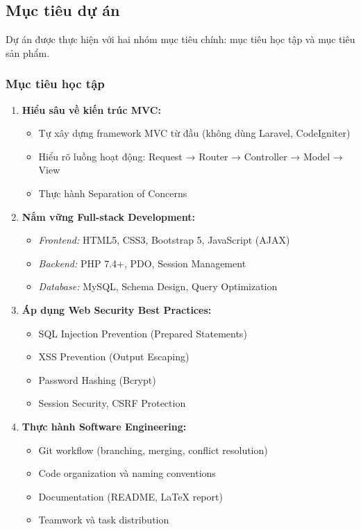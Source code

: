 \subsection{Mục tiêu dự án}

Dự án được thực hiện với hai nhóm mục tiêu chính: mục tiêu học tập và mục tiêu sản phẩm.

\subsubsection{Mục tiêu học tập}

\begin{enumerate}
    \item \textbf{Hiểu sâu về kiến trúc MVC:}
    \begin{itemize}
        \item Tự xây dựng framework MVC từ đầu (không dùng Laravel, CodeIgniter)
        \item Hiểu rõ luồng hoạt động: Request → Router → Controller → Model → View
        \item Thực hành Separation of Concerns
    \end{itemize}

    \item \textbf{Nắm vững Full-stack Development:}
    \begin{itemize}
        \item \textit{Frontend:} HTML5, CSS3, Bootstrap 5, JavaScript (AJAX)
        \item \textit{Backend:} PHP 7.4+, PDO, Session Management
        \item \textit{Database:} MySQL, Schema Design, Query Optimization
    \end{itemize}

    \item \textbf{Áp dụng Web Security Best Practices:}
    \begin{itemize}
        \item SQL Injection Prevention (Prepared Statements)
        \item XSS Prevention (Output Escaping)
        \item Password Hashing (Bcrypt)
        \item Session Security, CSRF Protection
    \end{itemize}

    \item \textbf{Thực hành Software Engineering:}
    \begin{itemize}
        \item Git workflow (branching, merging, conflict resolution)
        \item Code organization và naming conventions
        \item Documentation (README, LaTeX report)
        \item Teamwork và task distribution
    \end{itemize}
\end{enumerate}

